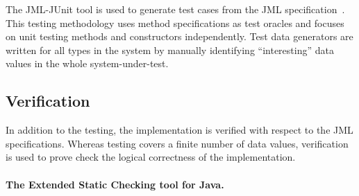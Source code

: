 \documentclass[letterpaper,twocolumn,10pt]{article}
\begin{document}
The JML-JUnit tool is used to generate test cases from the JML
specification~\cite{Cheon-Leavens02}.  This testing methodology uses
method specifications as test oracles and focuses on unit testing
methods and constructors independently.  Test data generators are
written for all types in the system by manually identifying
``interesting'' data values in the whole system-under-test.  




\subsection{Verification}

In addition to the testing, the implementation is verified with
respect to the JML specifications.  Whereas testing covers a finite
number of data values, verification is used to prove check the logical
correctness of the implementation.

\paragraph{The Extended Static Checking tool for Java.}
\end{document}
